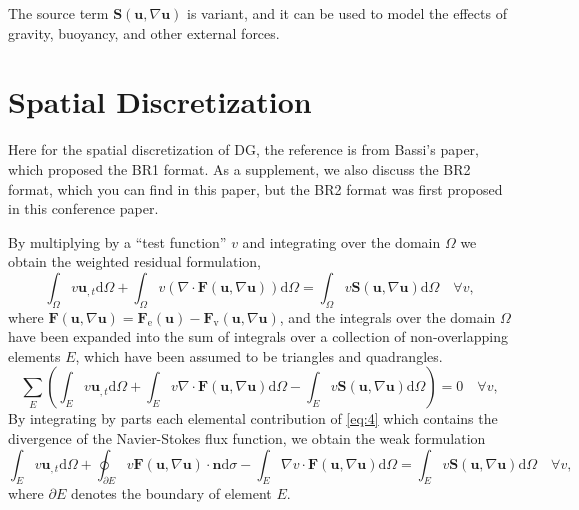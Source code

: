 \documentclass{develop-note}
\begin{document}
The source term $\mathbf{S}(\mathbf{u},\nabla\mathbf{u})$ is variant, and it can be used to model the effects of gravity, buoyancy, and other external forces.

\section{Spatial Discretization}

Here for the spatial discretization of DG, the reference is from Bassi's paper\cite{bassiHighOrderAccurateDiscontinuous1997a}, which proposed the BR1 format. As a supplement, we also discuss the BR2 format, which you can find in this paper\cite{bassiDiscontinuousGalerkinSolution2005}, but the BR2 format was first proposed in this conference paper\cite{bassiHighOrderAccurate1997}.

By multiplying by a ``test function'' $v$ and integrating over the domain $\Omega$ we obtain the weighted residual formulation,
\begin{equation}
  \label{eq:4}
  \int_{\Omega}v\mathbf{u}_{,t}\mathrm{d}\Omega+\int_{\Omega}v(\nabla\cdot\mathbf{F}(\mathbf{u},\nabla\mathbf{u}))\mathrm{d}\Omega=\int_{\Omega}v\mathbf{S}(\mathbf{u},\nabla\mathbf{u})\mathrm{d}\Omega\quad\forall v,
\end{equation}
where $\mathbf{F}(\mathbf{u},\nabla\mathbf{u})=\mathbf{F}_{\mathrm{e}}(\mathbf{u})-\mathbf{F}_{\mathrm{v}}(\mathbf{u},\nabla\mathbf{u})$, and the integrals over the domain $\Omega$ have been expanded into the sum of integrals over a collection of non-overlapping elements ${E}$, which have been assumed to be triangles and quadrangles.
\begin{equation}
  \sum_{E}\left(\int_{E}v\mathbf{u}_{,t}\mathrm{d}\Omega+\int_{E}v\nabla\cdot\mathbf{F}(\mathbf{u},\nabla\mathbf{u})\mathrm{d}\Omega-\int_{E}v\mathbf{S}(\mathbf{u},\nabla\mathbf{u})\mathrm{d}\Omega\right)=0\quad\forall v,
\end{equation}
By integrating by parts each elemental contribution of \autoref{eq:4} which contains the divergence of the Navier-Stokes flux function, we obtain the weak formulation
\begin{equation}
  \label{eq:6}
  \int_{E}v\mathbf{u}_{,t}\mathrm{d}\Omega+\oint_{\partial E}v\mathbf{F}(\mathbf{u},\nabla\mathbf{u})\cdot\mathbf{n}\mathrm{d}\sigma-\int_{E}\nabla v\cdot\mathbf{F}(\mathbf{u},\nabla\mathbf{u})\mathrm{d}\Omega=\int_{E}v\mathbf{S}(\mathbf{u},\nabla\mathbf{u})\mathrm{d}\Omega\quad\forall v,
\end{equation}
where $\partial E$ denotes the boundary of element $E$.
\end{document}
